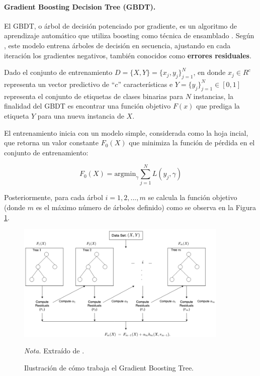 \paragraph{Gradient Boosting Decision Tree (GBDT).}
El GBDT, o árbol de decisión potenciado por gradiente, es un algoritmo de aprendizaje automático que utiliza boosting como técnica de ensamblado \citep{zhang_review_2022}. Según \citet{ke_lightgbm_2017}, este modelo entrena 
árboles de decisión en secuencia, ajustando en cada iteración los gradientes negativos, también conocidos como \textbf{errores residuales}.

Dado el conjunto de entrenamiento $D = \{X, Y\} = \{x_{j},y_{j}\}_{j=1}^N$, en donde $x_{j} \in R^c$ representa un vector predictivo de ``$c$'' características e 
$Y = \{y_j\}_{j=1}^N \in [0, 1]$ representa el conjunto de etiquetas de clases binarias para $N$ instancias, la finalidad del GBDT es encontrar una función objetivo $F(x)$ que prediga la etiqueta $Y$ 
para una nueva instancia de $X$. 

El entrenamiento inicia con un modelo simple, considerada como la hoja incial, que retorna un valor constante $F_{0}(X)$ que minimiza la función de pérdida en el conjunto de entrenamiento:

\begin{equation}
    F_0(X) = \text{argmin}_{\gamma} \sum_{j=1}^N L(y_j, \gamma)
\end{equation}

Posteriormente, para cada árbol $i = 1, 2, ..., m$ se calcula la función objetivo (donde $m$ es el máximo número de árboles definido) como se observa en la Figura \ref{fig:gbdt}.
\begin{figure}[H]
    \centering
    \caption{Ilustración de cómo trabaja el Gradient Boosting Tree.}
    \includegraphics[width=0.9\textwidth]{img/4_marco_teorico/gradient_boost.png}
    \label{fig:gbdt}
    \begin{flushleft}
        \textit{Nota.} Extraído de \citet{amazon_web_services_how_2024}. 
        \vspace{-\baselineskip}       
    \end{flushleft}
\end{figure}


